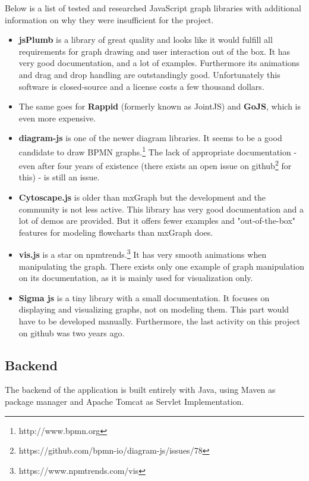 \documentclass[a4paper,top=25mm,bottom=25mm,12pt,pdftex,halfparskip,twoside,bibtotoc,numbers=noenddot]{scrbook}
\begin{document}
Below is a list of tested and researched JavaScript graph libraries with additional information on why they were insufficient for the project.
\begin{itemize}
	\item \textbf{jsPlumb} is a library of great quality and looks like it would fulfill all  requirements for graph drawing and user interaction out of the box. It has very good documentation, and a lot of examples. Furthermore its animations and drag and drop handling are outstandingly good. Unfortunately this software is closed-source and a license costs a few thousand dollars.
	\item The same goes for \textbf{Rappid} (formerly known as JointJS) and \textbf{GoJS}, which is even more expensive.
	\item \textbf{diagram-js} is one of the newer diagram libraries. It seems to be a good candidate to draw BPMN graphs.\footnote{http://www.bpmn.org} The lack of appropriate documentation - even after four years of existence (there exists an open issue on github\footnote{https://github.com/bpmn-io/diagram-js/issues/78} for this) - is still an issue.
	\item \textbf{Cytoscape.js} is older than mxGraph but the development and the community is not less active. This library has very good documentation and a lot of demos are provided. But it offers fewer examples and "out-of-the-box" features for modeling flowcharts than mxGraph does.
	\item \textbf{vis.js} is a star on npmtrends.\footnote{https://www.npmtrends.com/vis}  It has very smooth animations when manipulating the graph. There exists only one example of graph manipulation on its documentation, as it is mainly used for visualization only.
	\item \textbf{Sigma js} is a tiny library with a small documentation. It focuses on displaying and visualizing graphs, not on modeling them. This part would have to be developed manually. Furthermore, the last activity on this project on github was two years ago.
\end{itemize}


\subsection{Backend}

The backend  of the application is built entirely with Java, using Maven as package manager and Apache Tomcat as Servlet Implementation.
\end{document}
